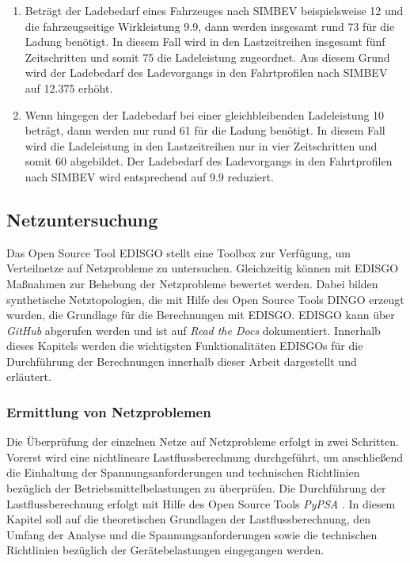 \begin{enumerate}
	\item Beträgt der Ladebedarf eines Fahrzeuges nach \gls{SIMBEV} beispielsweise \SI{12}{\kwh} und die fahrzeugseitige Wirkleistung \SI{9.9}{\kw}, dann werden insgesamt rund \SI{73}{\Minuten} für die Ladung benötigt. In diesem Fall wird in den Lastzeitreihen insgesamt fünf Zeitschritten und somit \SI{75}{\Minuten} die Ladeleistung zugeordnet. Aus diesem Grund wird der Ladebedarf des Ladevorgangs in den Fahrtprofilen nach \gls{SIMBEV} auf \SI{12.375}{\kwh} erhöht.
	\item Wenn hingegen der Ladebedarf bei einer gleichbleibenden Ladeleistung \SI{10}{\kwh} beträgt, dann werden nur rund \SI{61}{\Minuten} für die Ladung benötigt. In diesem Fall wird die Ladeleistung in den Lastzeitreihen nur in vier Zeitschritten und somit \SI{60}{\Minuten} abgebildet. Der Ladebedarf des Ladevorgangs in den Fahrtprofilen nach \gls{SIMBEV} wird entsprechend auf \SI{9.9}{\kwh} reduziert.
\end{enumerate}


\subsection{Netzuntersuchung}\label{chap:edisgo_theo}

Das Open Source Tool \gls{EDISGO} stellt eine Toolbox zur Verfügung, um Verteilnetze auf Netzprobleme zu untersuchen.
Gleichzeitig können mit \gls{EDISGO} Maßnahmen zur Behebung der Netzprobleme bewertet werden.
Dabei bilden synthetische Netztopologien, die mit Hilfe des Open Source Tools \gls{DINGO} erzeugt wurden, die Grundlage für die Berechnungen mit \gls{EDISGO}.
\gls{EDISGO} kann über \textit{GitHub} \cite{edisgoGit2019} abgerufen werden und ist auf \textit{Read the Docs} \cite{edisgoDocs2017} dokumentiert.
Innerhalb dieses Kapitels werden die wichtigsten Funktionalitäten \glspl{EDISGO} für die Durchführung der Berechnungen innerhalb dieser Arbeit dargestellt und erläutert.


\subsubsection{Ermittlung von Netzproblemen}\label{chap:grid_issues}

Die Überprüfung der einzelnen Netze auf Netzprobleme erfolgt in zwei Schritten.
Vorerst wird eine nichtlineare Lastflussberechnung durchgeführt, um anschließend die Einhaltung der Spannungsanforderungen und technischen Richtlinien bezüglich der Betriebsmittelbelastungen zu überprüfen.
Die Durchführung der Lastflussberechnung erfolgt mit Hilfe des Open Source Tools \textit{PyPSA} \cite{Brown2020}.
In diesem Kapitel soll auf die theoretischen Grundlagen der Lastflussberechnung, den Umfang der Analyse und die Spannungsanforderungen sowie die technischen Richtlinien bezüglich der Gerätebelastungen eingegangen werden.\medskip

